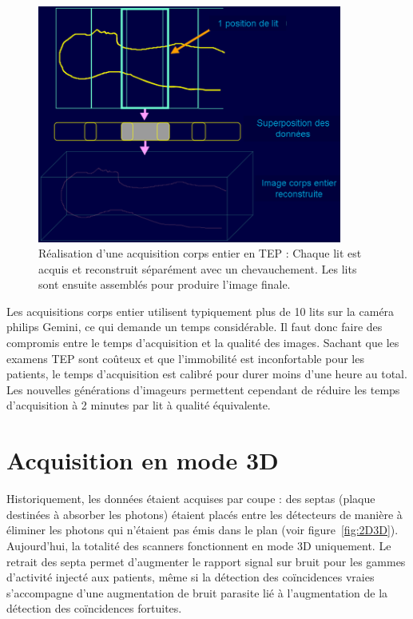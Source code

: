 \begin{figure}
\centering
\includegraphics[width=10cm]{images/multilits}
\caption[Acquisitions corps entier en TEP]{Réalisation d'une acquisition corps entier en TEP : Chaque lit est acquis et reconstruit séparément avec un chevauchement. Les lits sont ensuite assemblés pour produire l'image finale.}
\label{fig:multilits}
\end{figure}

Les acquisitions corps entier utilisent typiquement plus de 10 lits sur la caméra philips Gemini, ce qui demande un temps considérable. Il faut donc faire des compromis entre le temps d'acquisition et la qualité des images. Sachant que les examens TEP sont coûteux et que l'immobilité est inconfortable pour les patients, le temps d'acquisition est calibré pour durer moins d'une heure au total. Les nouvelles générations d'imageurs permettent cependant de réduire les temps d'acquisition à 2 minutes par lit à qualité équivalente.


	\section{Acquisition en mode 3D}

Historiquement, les données étaient acquises par coupe : des septas (plaque destinées à absorber les photons) étaient placés entre les détecteurs de manière à éliminer les photons qui n'étaient pas émis dans le plan (voir figure~\ref{fig:2D3D}).  Aujourd'hui, la totalité des scanners fonctionnent en mode 3D uniquement. Le retrait des septa permet d'augmenter le rapport signal sur bruit pour les gammes d'activité injecté aux patients, même si la détection des coïncidences vraies s'accompagne d'une augmentation de bruit parasite lié à l'augmentation de la détection des coïncidences fortuites.

